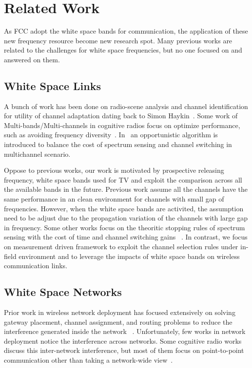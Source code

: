 \section{Related Work}
\label{sec:related}

As FCC adopt the white space bands for communication, the application
of these new frequency resource become new research spot. Many previous
works are related to the challenges for white space frequencies, but
no one focused on and answered on them.

\subsection{White Space Links}
\label{subsec:related_whitelinks}

A bunch of work has been done on radio-scene analysis and channel 
identification for utility of channel adaptation dating back to 
Simon Haykin~\cite{haykin2005cognitive}. Some work of Multi-bands/Multi-channels 
in cognitive radios focus on optimize performance, such as avoiding 
frequency diversity~\cite{rahul2009frequency}. In~\cite{OAR} an opportunistic 
algorithm is introduced to balance the cost of spectrum sensing and channel
switching in multichannel scenario.

Oppose to previous works, our work is motivated by prospective releasing 
frequency, white space bands used for TV and exploit the comparison 
across all the available bands in the future. Previous work assume 
all the channels have the same performance in an clean environment 
for channels with small gap of frequencies. However, when the white space
bands are activited, the assumption need to be adjust due to the propagation
variation of the channels with large gap in frequency. 
Some other works focus on the theoritic stopping rules of spectrum 
sensing with the cost of time and channel switching gains
~\cite{sabharwal2007opportunistic, OAR}. In contrast, we focus on
measurement driven framework to exploit the channel selection
rules under in-field environment and to leverage the impacts of 
white space bands on wireless communication links.

\subsection{White Space Networks}
\label{sec:related_subwhitemesh}

Prior work in wireless network deployment has focused extensively on 
solving gateway placement, channel assignment, and routing problems 
to reduce the interference generated inside the network
~\cite{he2008optimizing,ramachandran2006interference,akyildiz2006next}.
Unfortunately, few works in network deployment notice the interference 
across networks. Some cognitive radio works discuss this inter-network 
interference, but most of them focus on point-to-point communication 
other than taking a network-wide view~\cite{cabric2004implementation}.
 
